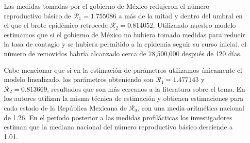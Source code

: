 \documentclass[12pt]{article}
\begin{document}
	Las medidas tomadas por el gobierno de México redujeron el número reproductivo básico de $ \mathcal{R}_1 = 1.755086 $ a más de la mitad y dentro del umbral en el que el brote epidémico retrocede $ \mathcal{R}_2 = 0.814052 $. Utilizando nuestro modelo estimamos que si el gobierno de México no hubiera tomado medidas para reducir la tasa de contagio y se hubiera permitido a la epidemia seguir su curso inicial, el número de removidos habría alcanzado cerca de 78,500,000 después de 120 días. 
	
	Cabe mencionar que si en la estimación de parámetros utilizamos únicamente el modelo linealizado, los parámetros obteniendo son $ \mathcal{R}_1 = 1.477143 $ y $ \mathcal{R}_2 = 0.813669 $, resultados que son más cercanos a la literatura sobre el tema. En \cite{Navarro-Robles2012} los autores utilizan la misma técnica de estimación y obtienen estimaciones para cada estado de la República Mexicana de $ \mathcal{R}_0 $, con una media aritmética nacional de 1.26. En el período posterior a las medidas profilácticas los investigadores estiman que la mediana nacional del número reproductivo básico desciende a 1.01.
	
	
	
	\printbibliography[title={Referencias}]
	
\end{document}
